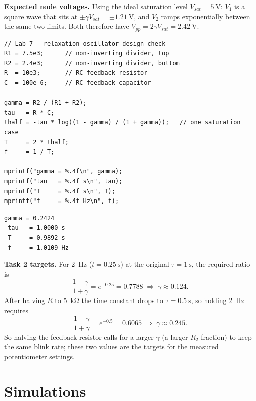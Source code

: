 \documentclass[11pt]{article}
\begin{document}
\textbf{Expected node voltages.}
Using the ideal saturation level $V_{sat}=\SI{5}{\volt}$: $V_1$ is a square wave
that sits at $\pm\gamma V_{sat}=\pm\SI{1.21}{\volt}$, and $V_2$ ramps
exponentially between the same two limits. Both therefore have
$V_{pp}=2\gamma V_{sat}=\SI{2.42}{\volt}$.

\begin{lstlisting}[style=scilab, caption={SciLab design check for the oscillator frequency}]
// Lab 7 - relaxation oscillator design check
R1 = 7.5e3;      // non-inverting divider, top
R2 = 2.4e3;      // non-inverting divider, bottom
R  = 10e3;       // RC feedback resistor
C  = 100e-6;     // RC feedback capacitor

gamma = R2 / (R1 + R2);
tau   = R * C;
thalf = -tau * log((1 - gamma) / (1 + gamma));   // one saturation case
T     = 2 * thalf;
f     = 1 / T;

mprintf("gamma = %.4f\n", gamma);
mprintf("tau   = %.4f s\n", tau);
mprintf("T     = %.4f s\n", T);
mprintf("f     = %.4f Hz\n", f);
\end{lstlisting}

\begin{lstlisting}[caption={SciLab runtime output}]
 gamma = 0.2424
 tau   = 1.0000 s
 T     = 0.9892 s
 f     = 1.0109 Hz
\end{lstlisting}

\textbf{Task 2 targets.}
For \SI{2}{\hertz} ($t=\SI{0.25}{\second}$) at the original $\tau=\SI{1}{\second}$,
the required ratio is
\[
    \frac{1-\gamma}{1+\gamma}=e^{-0.25}=0.7788
    \;\Rightarrow\;
    \gamma\approx0.124.
\]
After halving $R$ to \SI{5}{\kilo\ohm} the time constant drops to
$\tau=\SI{0.5}{\second}$, so holding \SI{2}{\hertz} requires
\[
    \frac{1-\gamma}{1+\gamma}=e^{-0.5}=0.6065
    \;\Rightarrow\;
    \gamma\approx0.245.
\]
So halving the feedback resistor calls for a larger $\gamma$ (a larger $R_2$
fraction) to keep the same blink rate; these two values are the targets for the
measured potentiometer settings.

\section*{Simulations}
\end{document}
